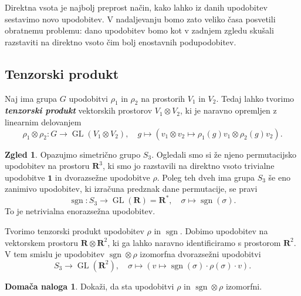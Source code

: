 \documentclass[11pt]{book}
\def\RR{\mathbf{R}}
\def\11{\mathbf{1}}
\DeclareMathOperator\sgn{sgn}
\DeclareMathOperator\GL{GL}
\def\definicija{\color{rdeca}\bf\em}
\theoremstyle{definition}
\theoremstyle{zgled}
\newtheorem*{zgled}{Zgled}
\theoremstyle{odprtproblem}
\theoremstyle{domacanaloga}
\newtheorem*{domacanaloga}{Domača naloga}
\theoremstyle{izrek}
\begin{document}
Direktna vsota je najbolj preprost način, kako lahko iz danih upodobitev sestavimo novo upodobitev. V nadaljevanju bomo zato veliko časa posvetili obratnemu problemu: dano upodobitev bomo kot v zadnjem zgledu skušali razstaviti na direktno vsoto čim bolj enostavnih podupodobitev.

\subsection{Tenzorski produkt}

Naj ima grupa $G$ upodobitvi $\rho_1$ in $\rho_2$ na prostorih $V_1$ in $V_2$. Tedaj lahko tvorimo {\definicija tenzorski produkt} vektorskih prostorov $V_1 \otimes V_2$, ki je naravno opremljen z linearnim delovanjem
\[
    \rho_1 \otimes \rho_2 \colon G \to \GL(V_1 \otimes V_2), \quad
    g \mapsto \left( v_1 \otimes v_2 \mapsto \rho_1(g) v_1 \otimes \rho_2(g) v_2 \right).
\]

\begin{zgled}
Opazujmo simetrično grupo $S_3$. Ogledali smo si že njeno permutacijsko upodobitev na prostoru $\RR^3$, ki smo jo razstavili na direktno vsoto trivialne upodobitve $\11$ in dvorazsežne upodobitve $\rho$. Poleg teh dveh ima grupa $S_3$ še eno zanimivo upodobitev, ki izračuna predznak dane permutacije, se pravi
\[
    \sgn \colon S_3 \to \GL(\RR) = \RR^*, \quad
    \sigma \mapsto \sgn(\sigma).
\]
To je netrivialna enorazsežna upodobitev.

Tvorimo tenzorski produkt upodobitev $\rho$ in $\sgn$. Dobimo upodobitev na vektorskem prostoru $\RR \otimes \RR^2$, ki ga lahko naravno identificiramo s prostorom $\RR^2$. V tem smislu je upodobitev $\sgn \otimes \rho$ izomorfna dvorazsežni upodobitvi
\[
    S_3 \to \GL(\RR^2), \quad
    \sigma \mapsto \left( v \mapsto \sgn(\sigma) \cdot \rho(\sigma) \cdot v \right).
\]
\begin{domacanaloga}
    Dokaži, da sta upodobitvi $\rho$ in $\sgn \otimes \rho$ izomorfni.
\end{domacanaloga}
\end{zgled}
\end{document}
